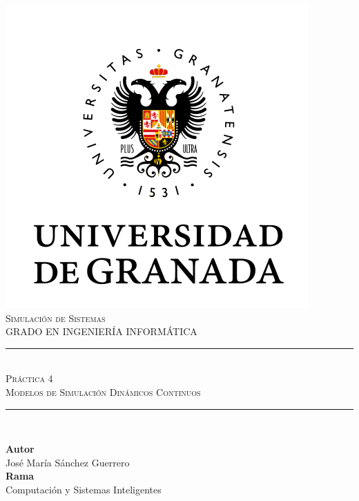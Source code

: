 \documentclass[11pt,a4paper]{article}
\newcommand{\asignatura}{Simulación de Sistemas}
\newcommand{\autor}{José María Sánchez Guerrero}
\newcommand{\titulo}{Práctica 4}
\newcommand{\subtitulo}{Modelos de Simulación Dinámicos Continuos}
\begin{document}

\begin{titlepage}

\begin{minipage}{\textwidth}

\centering

\includegraphics[scale=0.5]{img/ugr.png}\\

\textsc{\Large \asignatura{}\\[0.2cm]}
\textsc{GRADO EN INGENIERÍA INFORMÁTICA}\\[1cm]

\noindent\rule[-1ex]{\textwidth}{1pt}\\[1.5ex]
\textsc{{\Huge \titulo\\[0.5ex]}}
\textsc{{\Large \subtitulo\\}}
\noindent\rule[-1ex]{\textwidth}{2pt}\\[3.5ex]

\end{minipage}

\vspace{0.5cm}

\begin{minipage}{\textwidth}

\centering

\textbf{Autor}\\ {\autor{}}\\[2.5ex]
\textbf{Rama}\\ {Computación y Sistemas Inteligentes}\\[2.5ex]
\vspace{0.3cm}


\end{minipage}
\end{titlepage}
\end{document}
